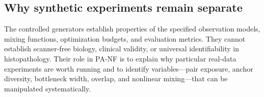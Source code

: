 \subsection{Why synthetic experiments remain separate}
The controlled generators establish properties of the specified observation models, mixing functions, optimization budgets, and evaluation metrics. They cannot establish scanner-free biology, clinical validity, or universal identifiability in histopathology. Their role in PA-NF is to explain why particular real-data experiments are worth running and to identify variables---pair exposure, anchor diversity, bottleneck width, overlap, and nonlinear mixing---that can be manipulated systematically.
